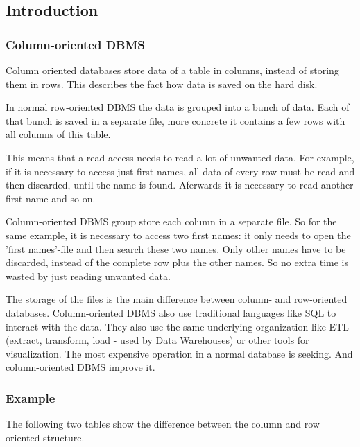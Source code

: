 
\subsection{Introduction}
\subsubsection{Column-oriented DBMS}

Column oriented databases store data of a table in columns, instead of storing them in rows. 
This describes the fact how data is saved on the hard disk.

In normal row-oriented DBMS the data is grouped into a bunch of data. 
Each of that bunch is saved in a separate file, more concrete it contains a few rows with all columns of this table. 
\cite{hbase.stavros.harizopoulos.2009}

This means that a read access needs to read a lot of unwanted data.
For example, if it is necessary to access just first names, all data of every row must be read and then discarded, until the name is found. 
Aferwards it is necessary to read another first name and so on. 
\cite{hbase.stavros.harizopoulos.2009}

Column-oriented DBMS group store each column in a separate file. 
So for the same example, it is necessary to access two first names: it only needs to open the 'first names'-file and then search these two names.
Only other names have to be discarded, instead of the complete row plus the other names.
So no extra time is wasted by just reading unwanted data.
\cite{hbase.daniel.abadi.2010}

The storage of the files is the main difference between column- and row-oriented databases.
Column-oriented DBMS also use traditional languages like SQL to interact with the data.
They also use the same underlying organization like ETL (extract, transform, load - used by Data Warehouses) or other tools for visualization.
\cite{hbase.amazon.2017}
The most expensive operation in a normal database is seeking. 
And column-oriented DBMS improve it.


\newpage

\subsubsection{Example}
The following two tables show the difference between the column and row oriented structure.


